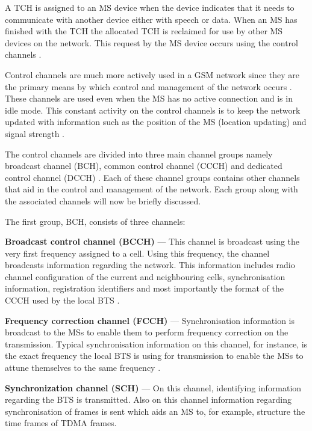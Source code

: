 A TCH is assigned to an MS device when the device indicates that it needs to communicate with another device either with speech or data. When an MS has finished with the TCH the allocated TCH is reclaimed for use by other MS devices on the network. This request by the MS device occurs using the control channels \cite{GSMArchitectureProtocolsServices}.

Control channels are much more actively used in a GSM network since they are the primary means by which control and management of the network occurs \cite{GSMArchitectureProtocolsServices}. These channels are used even when the MS has no active connection and is in idle mode. This constant activity on the control channels is to keep the network updated with information such as the position of the MS (location updating) and signal strength \cite{GSMArchitectureProtocolsServices,GSMSysEngin,Eisenblatter}. 

The control channels are divided into three main channel groups namely broadcast channel (BCH), common control channel (CCCH) and dedicated control channel (DCCH) \cite{GSMArchitectureProtocolsServices}. Each of these channel groups contains other channels that aid in the control and management of the network. Each group along with the associated channels will now be briefly discussed.

The first group, BCH, consists of three channels:
\begin{description}
\item{\textbf{Broadcast control channel (BCCH)}} --- This channel is broadcast using the very first frequency assigned to a cell. Using this frequency, the channel broadcasts information regarding the network. This information includes radio channel configuration of the current and neighbouring cells, synchronisation information, registration identifiers and most importantly the format of the CCCH used by the local BTS \cite{GSMArchitectureProtocolsServices}.
\item{\textbf{Frequency correction channel (FCCH)}} --- Synchronisation information is broadcast to the MSs to enable them to perform frequency correction on the transmission. Typical synchronisation information on this channel, for instance, is the exact frequency the local BTS is using for transmission to enable the MSs to attune themselves to the same frequency \cite{GSMArchitectureProtocolsServices}.
\item{\textbf{Synchronization channel (SCH)}} --- On this channel, identifying information regarding the BTS is transmitted. Also on this channel information regarding synchronisation of frames is sent which aids an MS to, for example, structure the time frames of TDMA frames.
\end{description}

